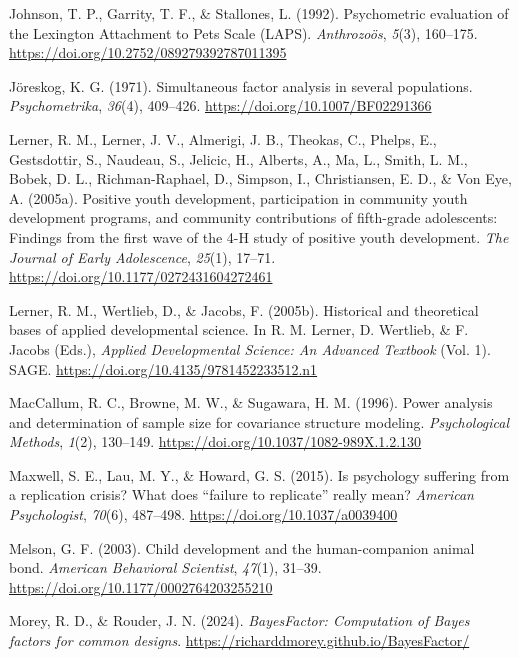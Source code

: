 \documentclass[
  jou,
  longtable,
  nolmodern,
  notxfonts,
  notimes,
  colorlinks=true,linkcolor=blue,citecolor=blue,urlcolor=blue]{apa7}
\newlength{\cslhangindent}
\newenvironment{CSLReferences}[2] %
 {\begin{list}{}{%
  \setlength{\itemindent}{0pt}
  \setlength{\leftmargin}{0pt}
  \setlength{\parsep}{0pt}
  \ifodd #1
   \setlength{\leftmargin}{\cslhangindent}
   \setlength{\itemindent}{-1\cslhangindent}
  \fi
  \setlength{\itemsep}{#2\baselineskip}}}
 {\end{list}}
\begin{document}
\begin{CSLReferences}{1}{0}
Johnson, T. P., Garrity, T. F., \& Stallones, L. (1992). Psychometric
evaluation of the {Lexington Attachment} to {Pets Scale} ({LAPS}).
\emph{Anthrozo{ö}s}, \emph{5}(3), 160--175.
\url{https://doi.org/10.2752/089279392787011395}

Jöreskog, K. G. (1971). Simultaneous factor analysis in several
populations. \emph{Psychometrika}, \emph{36}(4), 409--426.
\url{https://doi.org/10.1007/BF02291366}

Lerner, R. M., Lerner, J. V., Almerigi, J. B., Theokas, C., Phelps, E.,
Gestsdottir, S., Naudeau, S., Jelicic, H., Alberts, A., Ma, L., Smith,
L. M., Bobek, D. L., Richman-Raphael, D., Simpson, I., Christiansen, E.
D., \& Von Eye, A. (2005a). Positive youth development, participation in
community youth development programs, and community contributions of
fifth-grade adolescents: Findings from the first wave of the 4-{H} study
of positive youth development. \emph{The Journal of Early Adolescence},
\emph{25}(1), 17--71. \url{https://doi.org/10.1177/0272431604272461}

Lerner, R. M., Wertlieb, D., \& Jacobs, F. (2005b). Historical and
theoretical bases of applied developmental science. In R. M. Lerner, D.
Wertlieb, \& F. Jacobs (Eds.), \emph{Applied {Developmental Science}:
{An Advanced Textbook}} (Vol. 1). SAGE.
\url{https://doi.org/10.4135/9781452233512.n1}

MacCallum, R. C., Browne, M. W., \& Sugawara, H. M. (1996). Power
analysis and determination of sample size for covariance structure
modeling. \emph{Psychological Methods}, \emph{1}(2), 130--149.
\url{https://doi.org/10.1037/1082-989X.1.2.130}

Maxwell, S. E., Lau, M. Y., \& Howard, G. S. (2015). Is psychology
suffering from a replication crisis? {What} does {``failure to
replicate''} really mean? \emph{American Psychologist}, \emph{70}(6),
487--498. \url{https://doi.org/10.1037/a0039400}

Melson, G. F. (2003). Child development and the human-companion animal
bond. \emph{American Behavioral Scientist}, \emph{47}(1), 31--39.
\url{https://doi.org/10.1177/0002764203255210}

Morey, R. D., \& Rouder, J. N. (2024). \emph{BayesFactor: Computation of
{Bayes} factors for common designs}.
\url{https://richarddmorey.github.io/BayesFactor/}


\end{CSLReferences}
\end{document}
